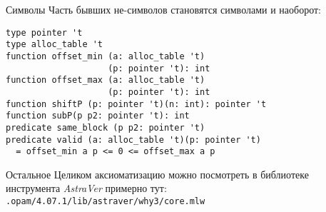 \documentclass[hyperref={unicode=true}]{beamer}
\begin{document}
    \begin{frame}[fragile]{Символы}
    Часть бывших не-символов становятся символами и наоборот:
    \begin{lstlisting}
type pointer 't
type alloc_table 't
function offset_min (a: alloc_table 't)
                    (p: pointer 't): int
function offset_max (a: alloc_table 't)
                    (p: pointer 't): int
function shiftP (p: pointer 't)(n: int): pointer 't
function subP(p p2: pointer 't): int
predicate same_block (p p2: pointer 't)
predicate valid (a: alloc_table 't)(p: pointer 't)
  = offset_min a p <= 0 <= offset_max a p
    \end{lstlisting}
    \end{frame}

    \begin{frame}{Остальное}
    Целиком аксиоматизацию можно посмотреть в
    библиотеке инструмента \textsl{AstraVer} примерно тут:
    \texttt{.opam/4.07.1/lib/astraver/why3/core.mlw}
    \end{frame}
\end{document}
